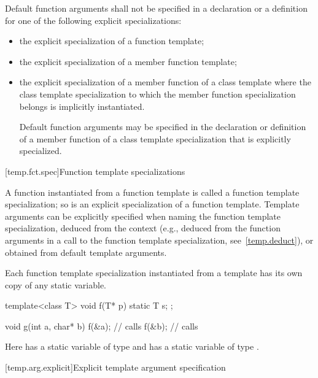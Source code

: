 \pnum
Default function arguments shall not be specified in a declaration or
a definition for one of the following explicit specializations:
\begin{itemize}
\item
the explicit specialization of a function template;
\item
the explicit specialization of a member function template;
\item
the explicit specialization of a member function of a class template where
the class template specialization to which the member function specialization
belongs is implicitly instantiated.
\begin{note}
Default function arguments may be specified in the declaration or
definition of a member function of a class template specialization that is
explicitly specialized.
\end{note}
\end{itemize}

[temp.fct.spec]{Function template specializations}

\pnum
{}%
A function instantiated from a function template is called a function template
specialization; so is an explicit specialization of a function template.
Template arguments can be explicitly specified when naming the function
template specialization, deduced from the context (e.g.,
deduced from the function arguments in a call to the function template
specialization, see~\ref{temp.deduct}), or obtained from default template arguments.

\pnum
Each function template specialization instantiated from a template
has its own copy of any static variable.
\begin{example}
\begin{codeblock}
template<class T> void f(T* p) {
  static T s;
};

void g(int a, char* b) {
  f(&a);            // calls 
  f(&b);            // calls 
}
\end{codeblock}

Here
has a static variable
of type
and
has a static variable
of type
.
\end{example}

[temp.arg.explicit]{Explicit template argument specification}

